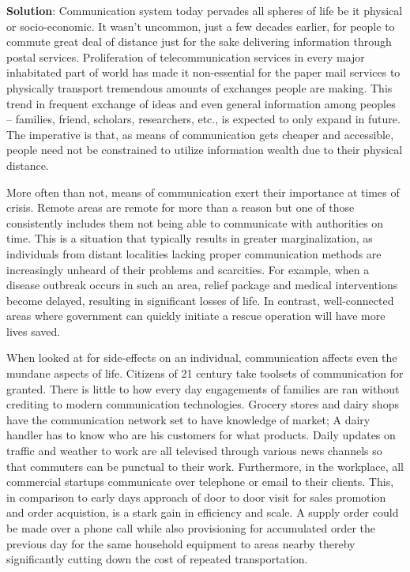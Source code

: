 \documentclass[
  openany]{book}
\newenvironment{solution}{ {\bfseries Solution}:}{}
\begin{document}
\begin{solution}
Communication system today pervades all spheres of life be it physical or socio-economic. It wasn't uncommon, just a few decades earlier, for people to commute great deal of distance just for the sake delivering information through postal services. Proliferation of telecommunication services in every major inhabitated part of world has made it non-essential for the paper mail services to physically transport tremendous amounts of exchanges people are making. This trend in frequent exchange of ideas and even general information among peoples -- families, friend, scholars, researchers, etc., is expected to only expand in future. The imperative is that, as means of communication gets cheaper and accessible, people need not be constrained to utilize information wealth due to their physical distance.

More often than not, means of communication exert their importance at times of crisis. Remote areas are remote for more than a reason but one of those consistently includes them not being able to communicate with authorities on time. This is a situation that typically results in greater marginalization, as individuals from distant localities lacking proper communication methods are increasingly unheard of their problems and scarcities. For example, when a disease outbreak occurs in such an area, relief package and medical interventions become delayed, resulting in significant losses of life. In contrast, well-connected areas where government can quickly initiate a rescue operation will have more lives saved.

When looked at for side-effects on an individual, communication affects even the mundane aspects of life. Citizens of 21 century take toolsets of communication for granted. There is little to how every day engagements of families are ran without crediting to modern communication technologies. Grocery stores and dairy shops have the communication network set to have knowledge of market; A dairy handler has to know who are his customers for what products. Daily updates on traffic and weather to work are all televised through various news channels so that commuters can be punctual to their work. Furthermore, in the workplace, all commercial startups communicate over telephone or email to their clients. This, in comparison to early days approach of door to door visit for sales promotion and order acquistion, is a stark gain in efficiency and scale. A supply order could be made over a phone call while also provisioning for accumulated order the previous day for the same household equipment to areas nearby thereby significantly cutting down the cost of repeated transportation.


\end{solution}
\end{document}

